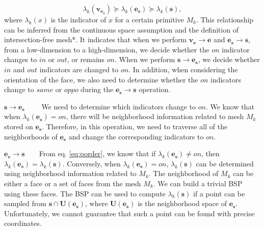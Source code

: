 \begin{equation}
\label{eq:porder}
\lambda_k(\bm{v}_{\bm{e}_{\bm{s}}}) \succeq \lambda_k(\bm{e}_{\bm{s}}) \succeq \lambda_k(\bm{s}),
\end{equation}
where $\lambda_k(x)$ is the indicator of $x$ for a certain primitive $M_k$. This relationship can be inferred from the continuous space assumption and the definition of intersection-free mesh*. It indicates that when we perform $\bm{v}_{\bm{e}}\to \bm{e}$ and $\bm{e}_{\bm{s}}\to \bm{s}$, from a low-dimension to a high-dimension, we decide whether the $on$ indicator changes to $in$ or $out$, or remains $on$. When we perform $\bm{s}\to \bm{e}_{\bm{s}}$, we decide whether $in$ and $out$ indicators are changed to $on$. In addition, when considering the orientation of the face, we also need to determine whether the $on$ indicators change to $same$ or $oppo$ during the $\bm{e}_{\bm{s}}\to \bm{s}$ operation.


\vspace{0.5em}
\noindent\textbf{$\bm{s\to \bm{e}_{\bm{s}}}$}~~~~ We need to determine which indicators change to $on$. We know that when $\lambda_k(\bm{e}_{\bm{s}})=on$, there will be neighborhood information related to mesh $M_k$ stored on $\bm{e}_{\bm{s}}$. Therefore, in this operation, we need to traverse all of the neighborhoods of $\bm{e}_{\bm{s}}$ and change the corresponding indicators to $on$.



\vspace{0.5em}
\noindent\textbf{$\bm{\bm{e}_{\bm{s}}\to \bm{s}}$}~~~~From eq. \ref{eq:porder}, we know that if $\lambda_k(\bm{e}_{\bm{s}}) \neq on$, then $\lambda_k(\bm{e}_{\bm{s}})=\lambda_k(\bm{s})$. Conversely, when $\lambda_k(\bm{e}_{\bm{s}}) = on$, $\lambda_k(\bm{s})$ can be determined using neighborhood information related to $M_k$. The neighborhood of $M_k$ can be either a face or a set of faces from the mesh $M_k$.  We can build a trivial BSP \cite{thibault1987set} using these faces. The BSP can be used to compute $\lambda_k(\bm{s})$ if a point can be sampled from $\bm{s} \cap \bm{U}(\bm{e}_{\bm{s}})$, where $\bm{U}(\bm{e}_{\bm{s}})$ is the neighborhood space of $\bm{e}_{\bm{s}}$. Unfortunately, we cannot guarantee that such a point can be found with precise coordinates.

